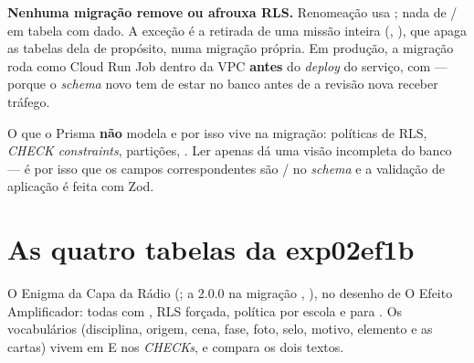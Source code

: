 \begin{regra}
\textbf{Nenhuma migração remove  ou afrouxa RLS.} Renomeação usa
; nada de / em tabela com dado. A exceção é a
retirada de uma missão inteira (, ), que apaga as tabelas dela de
propósito, numa migração própria. Em produção, a
migração roda como Cloud Run Job dentro da VPC \textbf{antes} do \emph{deploy} do
serviço, com  --- porque o \emph{schema} novo tem de estar no banco
antes de a revisão nova receber tráfego.
\end{regra}

\begin{atencao}
O que o Prisma \textbf{não} modela e por isso vive na migração:
políticas de RLS, \emph{CHECK constraints}, partições, . Ler
apenas  dá uma visão incompleta do banco --- é por isso que os
campos correspondentes são / no \emph{schema} e a validação
de aplicação é feita com Zod.
\end{atencao}

\section{As quatro tabelas da exp02ef1b}
\label{sec:tabelas-exp02ef1b}

O Enigma da Capa da Rádio (; a 2.0.0 na migração
, ), no desenho de O Efeito
Amplificador: todas com , RLS forçada, política por
escola e  para . Os vocabulários (disciplina,
origem, cena, fase, foto, selo, motivo, elemento e as cartas)
vivem em  E nos \emph{CHECKs}, e
 compara os dois textos.

